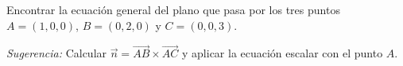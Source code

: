 Encontrar la ecuación general del plano que pasa por los tres puntos $A = (1, 0, 0)$, $B = (0, 2, 0)$ y $C = (0, 0, 3)$.

\textit{Sugerencia:} Calcular $\vec{n} = \overrightarrow{AB} \times \overrightarrow{AC}$ y aplicar la ecuación escalar con el punto $A$.